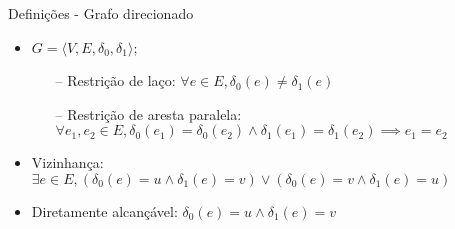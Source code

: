 \begin{frame}{Definições - Grafo direcionado}
    \begin{itemize}
        \item $G = \langle V,E,\delta_0, \delta_1 \rangle$;
        \begin{itemize}
            \item[--] Restrição de laço: $\forall e \in E, \delta_0(e) \neq \delta_1(e)$
            \item[--] Restrição de aresta paralela: $\forall e_1, e_2 \in E, \delta_0(e_1) = \delta_0(e_2) \land \delta_1(e_1) = \delta_1(e_2) \implies e_1 = e_2$
        \end{itemize}
        \item[]
        \item Vizinhança: $\exists e \in E, (\delta_0(e) = u \land \delta_1(e) = v) \lor (\delta_0(e) = v \land \delta_1(e) = u)$
        \item Diretamente alcançável: $\delta_0(e) = u \land \delta_1(e) = v$
    \end{itemize}
\end{frame}